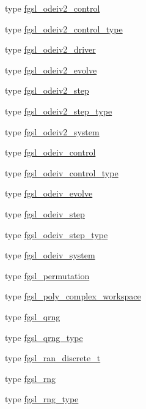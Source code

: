 \begin{DoxyCompactItemize}
\item 
type \hyperlink{structfgsl_1_1fgsl__odeiv2__control}{fgsl\-\_\-odeiv2\-\_\-control}
\item 
type \hyperlink{structfgsl_1_1fgsl__odeiv2__control__type}{fgsl\-\_\-odeiv2\-\_\-control\-\_\-type}
\item 
type \hyperlink{structfgsl_1_1fgsl__odeiv2__driver}{fgsl\-\_\-odeiv2\-\_\-driver}
\item 
type \hyperlink{structfgsl_1_1fgsl__odeiv2__evolve}{fgsl\-\_\-odeiv2\-\_\-evolve}
\item 
type \hyperlink{structfgsl_1_1fgsl__odeiv2__step}{fgsl\-\_\-odeiv2\-\_\-step}
\item 
type \hyperlink{structfgsl_1_1fgsl__odeiv2__step__type}{fgsl\-\_\-odeiv2\-\_\-step\-\_\-type}
\item 
type \hyperlink{structfgsl_1_1fgsl__odeiv2__system}{fgsl\-\_\-odeiv2\-\_\-system}
\item 
type \hyperlink{structfgsl_1_1fgsl__odeiv__control}{fgsl\-\_\-odeiv\-\_\-control}
\item 
type \hyperlink{structfgsl_1_1fgsl__odeiv__control__type}{fgsl\-\_\-odeiv\-\_\-control\-\_\-type}
\item 
type \hyperlink{structfgsl_1_1fgsl__odeiv__evolve}{fgsl\-\_\-odeiv\-\_\-evolve}
\item 
type \hyperlink{structfgsl_1_1fgsl__odeiv__step}{fgsl\-\_\-odeiv\-\_\-step}
\item 
type \hyperlink{structfgsl_1_1fgsl__odeiv__step__type}{fgsl\-\_\-odeiv\-\_\-step\-\_\-type}
\item 
type \hyperlink{structfgsl_1_1fgsl__odeiv__system}{fgsl\-\_\-odeiv\-\_\-system}
\item 
type \hyperlink{structfgsl_1_1fgsl__permutation}{fgsl\-\_\-permutation}
\item 
type \hyperlink{structfgsl_1_1fgsl__poly__complex__workspace}{fgsl\-\_\-poly\-\_\-complex\-\_\-workspace}
\item 
type \hyperlink{structfgsl_1_1fgsl__qrng}{fgsl\-\_\-qrng}
\item 
type \hyperlink{structfgsl_1_1fgsl__qrng__type}{fgsl\-\_\-qrng\-\_\-type}
\item 
type \hyperlink{structfgsl_1_1fgsl__ran__discrete__t}{fgsl\-\_\-ran\-\_\-discrete\-\_\-t}
\item 
type \hyperlink{structfgsl_1_1fgsl__rng}{fgsl\-\_\-rng}
\item 
type \hyperlink{structfgsl_1_1fgsl__rng__type}{fgsl\-\_\-rng\-\_\-type}
\item 

\end{DoxyCompactItemize}
